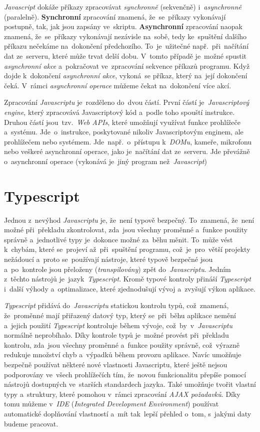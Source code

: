 \documentclass[11pt,a4paper]{report}
\begin{document}
            \emph{Javascript} dokáže příkazy zpracovávat \emph{synchronně} (sekvenčně) i~\emph{asynchronně} (paralelně). \textbf{Synchronní} zpracování znamená, že~se~příkazy vykonávají postupně, tak, jak jsou zapsány ve~skriptu. \textbf{Asynchronní} zpracování naopak znamená, že~se~příkazy vykonávají nezávisle na~sobě, tedy ke~spuštění dalšího příkazu nečekáme na~dokončení předchozího. To~je~užitečné např.~při~načítání dat ze~serveru, které může trvat delší dobu. V~tomto případě je~možné spustit \emph{asynchronní akce} a~pokračovat ve~zpracování sekvence příkazů programu. Když dojde k~dokončení \emph{asynchronní akce}, vykoná~se příkaz, který na~její dokončení čeká. V~rámci \emph{asynchronní operace} můžeme čekat na~dokončení více akcí. \cite{kantor_javascript}

            Zpracování \emph{Javascriptu} je~rozděleno do~dvou částí. První částí je~\emph{Javascriptový engine}, který zpracovává Javascriptový kód a~podle toho spouští instrukce. Druhou částí jsou~tzv.~\emph{Web APIs}, které umožňují využívat funkce prohlížeče a~systému. Jde~o~instrukce, poskytované nikoliv Javascriptovým enginem, ale prohlížečem nebo systémem. Jde~např.~o~přístupu k~\emph{DOMu}, kameře, mikrofonu nebo veškeré asynchronní operace, jako je~načítání dat ze~serveru. Jde převážně o~asynchronní operace (vykonává je~jiný program než~\emph{Javascript}) \cite{kantor_javascript}

        \section{Typescript}
            Jednou z~nevýhod \emph{Javascriptu} je, že~není typově bezpečný. To~znamená, že~není možné při~překladu zkontrolovat, zda~jsou všechny proměnné a~funkce použity správně a~jednotlivé typy je~dokonce možné za~běhu měnit. To~může vést k~chybám, které se~projeví až~při~spuštění programu, což~je~pro~větší projekty nežádoucí a~proto se~používají nástroje, které typově bezpečné jsou a~po~kontrole jsou přeloženy (\emph{transpilovány}) zpět do~\emph{Javascriptu}. Jedním z~těchto nástrojů je~jazyk~\emph{Typescript}. Kromě typové kontroly přináší \emph{Typescript} i~další výhody a~optimalizace, které zjednodušují vývoj a~zvyšují výkon aplikace.

            \emph{Typescript} přidává do~\emph{Javascriptu} statickou kontrolu typů, což~znamená, že~proměnné mají přiřazený datový typ, který se~při~běhu aplikace nemění a~jejich použití \emph{Typescript} kontroluje během vývoje, což~by~v~\emph{Javascriptu} normálně neprobíhalo. Díky kontrole typů je~možné provést při~překladu kontrolu, zda~jsou všechny proměnné a~funkce použity správně, což~výrazně redukuje množství chyb a~výpadků během provozu aplikace. Navíc umožňuje bezpečně používat některé nové vlastnosti Javascriptu, které ještě nejsou podporovány ve~všech prohlížečích tím, že~novou funkcionalitu přepíše pomocí nástrojů dostupných ve~starších standardech jazyka. Také umožňuje tvořit vlastní typy a~struktury, které pomohou v~rámci zpracování \emph{AJAX požadavků}. Díky tomu můžeme v~\emph{IDE} (\emph{Integrated Development Environment}) používat automatické doplňování vlastností a~mít tak~lepší přehled o~tom, s~jakými daty budeme pracovat.
\end{document}

